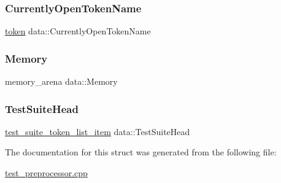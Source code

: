 \subsubsection{\texorpdfstring{Currently\+Open\+Token\+Name}{CurrentlyOpenTokenName}}
{\footnotesize\ttfamily \hyperlink{structtoken}{token} data\+::\+Currently\+Open\+Token\+Name}

\mbox{\label{structdata_ad3188e5c8551b604c9d2c3ddbf29a9b8}} 
\subsubsection{\texorpdfstring{Memory}{Memory}}
{\footnotesize\ttfamily memory\+\_\+arena data\+::\+Memory}

\mbox{\label{structdata_a5bb01b3754cb4b3baf9b7f499022cd1e}} 
\subsubsection{\texorpdfstring{Test\+Suite\+Head}{TestSuiteHead}}
{\footnotesize\ttfamily \hyperlink{structtest__suite__token__list__item}{test\+\_\+suite\+\_\+token\+\_\+list\+\_\+item} data\+::\+Test\+Suite\+Head}



The documentation for this struct was generated from the following file\+:\begin{DoxyCompactItemize}
\item 
\hyperlink{test__preprocessor_8cpp}{test\+\_\+preprocessor.\+cpp}\end{DoxyCompactItemize}

